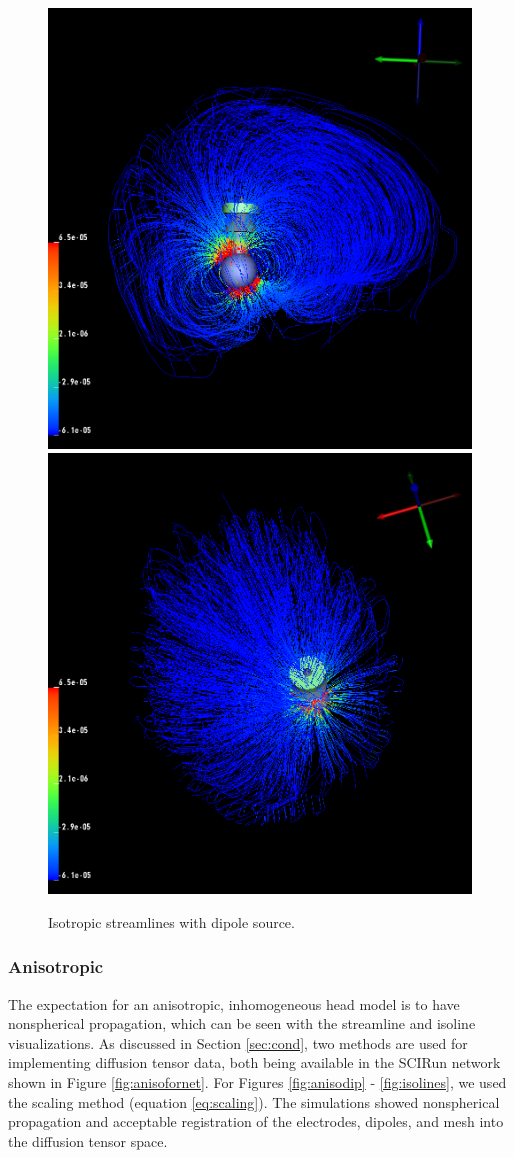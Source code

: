 \begin{figure}[H]
\begin{center}
\includegraphics[width=.49\textwidth]{Figures/iso_streamlines}
\includegraphics[width=.49\textwidth]{Figures/iso_streamlines_top}
\caption{Isotropic streamlines with dipole source.}
\label{fig:isostream}
\end{center}
\end{figure}

\subsubsection{Anisotropic}

The expectation for an anisotropic, inhomogeneous head model is to have nonspherical propagation, which can be seen with the streamline and isoline visualizations. As discussed in Section \ref{sec:cond}, two methods are used for implementing diffusion tensor data, both being available in the SCIRun network shown in Figure \ref{fig:anisofornet}. For Figures \ref{fig:anisodip} - \ref{fig:isolines}, we used the scaling method (equation \ref{eq:scaling}). The simulations showed nonspherical propagation and acceptable registration of the electrodes, dipoles, and mesh into the diffusion tensor space.


